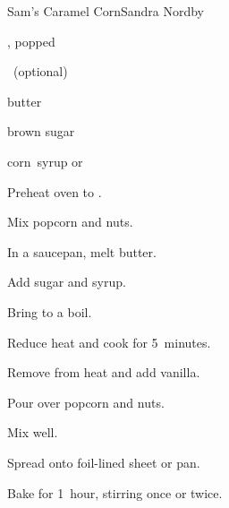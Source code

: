 \begin{recipe}{Sam's Caramel Corn}{Sandra Nordby}{}

\begin{ingredients}
\item {} , popped
\item {} ~(optional)
\item \C{\half} butter
\item {} brown sugar
\item \C{\quarter} corn~syrup or 
\item {}
\end{ingredients}

\begin{directions}
\item Preheat oven to .
\item Mix popcorn and nuts.
\item In a saucepan, melt butter.
\item Add sugar and syrup.
\item Bring to a boil.
\item Reduce heat and cook for 5~minutes.
\item Remove from heat and add vanilla.
\item Pour over popcorn and nuts.
\item Mix well.
\item Spread onto foil-lined sheet or pan.
\item Bake for 1~hour, stirring once or twice.
\end{directions}

\end{recipe}
